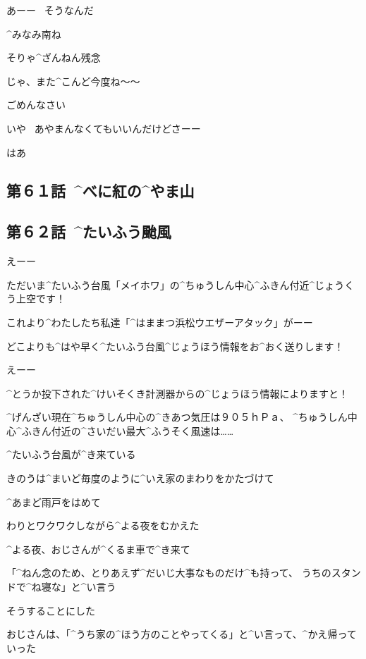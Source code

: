 \Maruko あーー
\ そうなんだ

\Maruko ^{みなみ}{南}ね

\Maruko そりゃ^{ざんねん}{残念}

\page
\Maruko じゃ、また^{こんど}{今度}ね〜〜

\Kokone ごめんなさい

\Maruko いや
\ あやまんなくてもいいんだけどさーー

\Kokone はあ


\subsection{第６１話\ ^{べに}{紅}の^{やま}{山}}


\subsection{第６２話\ ^{たいふう}{颱風}}

\page[98]
\Person えーー

\Person ただいま^{たいふう}{台風}「メイホワ」の^{ちゅうしん}{中心}^{ふきん}{付近}^{じょうくう}{上空}です！

\Person これより^{わたしたち}{私達}「^{はままつ}{浜松}ウエザーアタック」がーー

\Person どこよりも^{はや}{早}く^{たいふう}{台風}^{じょうほう}{情報}をお^{おく}{送}りします！

\page
\Person えーー

\Person ^{とうか}{投下}された^{けいそくき}{計測器}からの^{じょうほう}{情報}によりますと！

\Person ^{げんざい}{現在}^{ちゅうしん}{中心}の^{きあつ}{気圧}は９０５ｈＰａ、
^{ちゅうしん}{中心}^{ふきん}{付近}の^{さいだい}{最大}^{ふうそく}{風速}は……

\page
\Alpha ^{たいふう}{台風}が^{き}{来}ている

\Alpha きのうは^{まいど}{毎度}のように^{いえ}{家}のまわりをかたづけて

\Alpha ^{あまど}{雨戸}をはめて

\Alpha わりとワクワクしながら^{よる}{夜}をむかえた

\Alpha ^{よる}{夜}、おじさんが^{くるま}{車}で^{き}{来}て

\Alpha 「^{ねん}{念}のため、とりあえず^{だいじ}{大事}なものだけ^{も}{持}って、
うちのスタンドで^{ね}{寝}な」と^{い}{言}う

\Alpha そうすることにした

\page
\Alpha おじさんは、「^{うち}{家}の^{ほう}{方}のことやってくる」と^{い}{言}って、^{かえ}{帰}っていった

